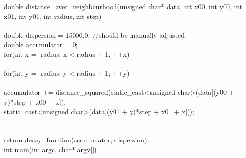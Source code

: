 \documentclass[a4paper,12pt]{article}
\begin{document}
double distance\_over\_neighbourhood(unsigned char* data, int x00, int y00, int x01, int y01, int radius, int step)
\\{
\\    double dispersion = 15000.0; //should be manually adjusted
\\    double accumulator = 0;
\\	for(int x = -radius; x < radius + 1; ++x)
\\	{
\\		for(int y = -radius; y < radius + 1; ++y)
\\		{
\\            accumulator += distance\_squared(static\_cast<unsigned char>(data[(y00 + y)*step + x00 + x]), \\static\_cast<unsigned char>(data[(y01 + y)*step + x01 + x]));
\\		}
\\	}
\\    return decay\_function(accumulator, dispersion);
\\}
int main(int argc, char* argv[])
\end{document}
